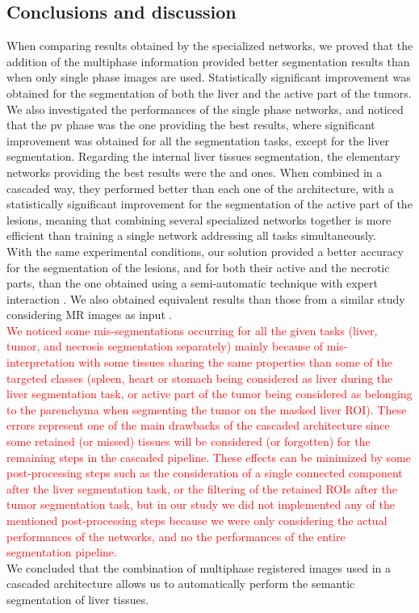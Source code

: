 \subsection{Conclusions and discussion}\label{IJCARS_conclusions_and_discussion}

When comparing results obtained by the specialized networks, we proved
that the addition of the multiphase information provided better
segmentation results than when only single phase images are used.
Statistically significant improvement was obtained for the segmentation
of both the liver and the active part of the tumors.
We also investigated the performances of the single phase networks, and
noticed that the \ac{pv} phase was the one providing the best results,
where significant improvement was obtained for all the segmentation
tasks, except for the liver segmentation.
Regarding the internal liver tissues segmentation, the elementary
networks providing the best results were the  
and  ones. When combined in a cascaded way, 
they performed better than each one of the  architecture, 
with a statistically significant improvement
for the segmentation of the active part of the lesions, meaning that 
combining several specialized networks together is more efficient 
than training a single network addressing all tasks simultaneously.\\
With the same experimental conditions, our solution provided a better
accuracy for the segmentation of the lesions, and for both their active
and the necrotic parts, than the one obtained using a semi-automatic
technique with expert interaction \cite{Ouhmich2019,Conze2017}. We also
obtained equivalent results than those from a similar study considering
MR images as input \cite{Zhang2018}.\\
\textcolor{red}
{
We noticed some mis-segmentations occurring for all the given tasks (liver, tumor, and necrosis segmentation separately) mainly because of mis-interpretation with some tissues sharing the same properties than some of the targeted classes (spleen, heart or stomach being considered as liver during the liver segmentation task, or active part of the tumor being considered as belonging to the parenchyma when segmenting the tumor on the masked liver ROI). These errors represent one of the main drawbacks of the cascaded architecture since some retained (or missed) tissues will be considered (or forgotten) for the remaining steps in the cascaded pipeline. These effects can be minimized by some post-processing steps such as the consideration of a single connected component after the liver segmentation task, or the filtering of the retained ROIs after the tumor segmentation task, but in our study we did not implemented any of the mentioned post-processing steps because we were only considering the actual performances of the networks, and no the performances of the entire segmentation pipeline.
} \\
We concluded that the combination of multiphase registered images used in a 
cascaded architecture allows us to automatically perform the semantic segmentation of liver tissues.

